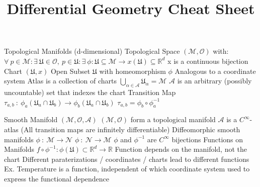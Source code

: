\documentclass[14pt]{extarticle}
\title{Differential Geometry Cheat Sheet}
\begin{document}
	\maketitle
	\begin{outline}
		\1	Topological Manifolds (d-dimensional)
			\2	Topological Space $(\mathcal{M},\mathcal{O})$ with:
				\3	$\forall~p\in \mathcal{M}:\exists~\mathfrak{U} \in \mathcal{O},~
						 p \in \mathfrak{U} :\exists~\phi:\mathfrak{U} \subseteq \mathcal{M} 
						 \rightarrow x(\mathfrak{U}) \subseteq \mathbb{R}^d$
				\3	x is a continuous bijection
			\2	Chart $(\mathfrak{U},x)$
				\3	Open Subset $\mathfrak{U}$ with homeomorphism $\phi$
				\3	Analogous to a coordinate system
			\2	Atlas is a collection of charts
				\3	$\bigcup_{\alpha \in \mathcal{A}} \mathfrak{U}_{\alpha} = \mathcal{M}$
				\3	$\mathcal{A}$ is an arbitrary (possibly uncountable) set that indexes the chart
			\2	Transition Map
				\3	$\tau_{a,b}~:~\phi_a(\mathfrak{U}_a \cap \mathfrak{U}_b) \rightarrow
							\phi_b(\mathfrak{U}_a \cap \mathfrak{U}_b)$
				\3	$\tau_{a,b} = \phi_b \circ \phi_a^{-1}$
	
		\1	Smooth Manifold $(\mathcal{M},\mathcal{O},\mathcal{A})$
			\2	$(\mathcal{M},\mathcal{O})$ form a topological manifold
			\2	$\mathcal{A}$ is a $C^{\infty}$-atlas (All transition maps are infinitely differentiable)
			\2	Diffeomorphic smooth manifolds
				\3	$\phi~:~\mathcal{M} \rightarrow \mathcal{N}$
				\3	$\phi~:~\mathcal{N} \rightarrow \mathcal{M}$
				\3	$\phi$ and $\phi^{-1}$ are $C^{\infty}$ bijections
			\2	Functions on Manifolds
				\3	$f \circ \phi^{-1} : \phi(\mathfrak{U}) \subset \mathbb{R}^d \rightarrow \mathbb{R}$
				\3	Function depends on the manifold, not the chart
				\3	Different paraterizations / coordinates / charts lead to different functions
				\3	Ex. Temperature is a function, independent of which coordinate system used to express the functional dependence
		

\end{outline}
\end{document}
